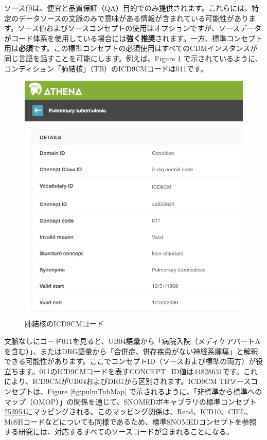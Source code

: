 \documentclass[
  11pt]{book}
\theoremstyle{definition}
\theoremstyle{definition}
\theoremstyle{definition}
\theoremstyle{definition}
\theoremstyle{remark}
\begin{document}
ソース値は、便宜と品質保証（QA）目的でのみ提供されます。これらには、特定のデータソースの文脈のみで意味がある情報が含まれている可能性があります。ソース値およびソースコンセプトの使用はオプションですが、ソースデータがコード体系を使用している場合には\textbf{強く推奨}されます。一方、標準コンセプト用は\textbf{必須}です。この標準コンセプトの必須使用はすべてのCDMインスタンスが同じ言語を話すことを可能にします。例えば、Figure \ref{fig:pulmTubICD9} で示されているように、コンディション「肺結核」（TB）のICD9CMコードは011です。

\begin{figure}

{\centering \includegraphics[width=0.75\linewidth]{images/CommonDataModel/pulmTubICD9} 

}

\caption{肺結核のICD9CMコード}\label{fig:pulmTubICD9}
\end{figure}

文脈なしにコード011を見ると、UB04語彙から「病院入院（メディケアパートAを含む）」、またはDRG語彙から「合併症、併存疾患がない神経系腫瘍」と解釈できる可能性があります。ここでコンセプトID（ソースおよび標準の両方）が役立ちます。011のICD9CMコードを表すCONCEPT\_ID値は\href{http://athena.ohdsi.org/search-terms/terms/44828631}{44828631}です。これにより、ICD9CMがUB04およびDRGから区別されます。ICD9CM TBソースコンセプトは、Figure \ref{fig:pulmTubMap} で示されるように、「非標準から標準へのマップ（OMOP）」の関係を通じて、SNOMEDボキャブラリの標準コンセプト \href{http://athena.ohdsi.org/search-terms/terms/253954}{253954}にマッピングされる。このマッピング関係は、Read、ICD10、CIEL、MeSHコードなどについても同様であるため、標準SNOMEDコンセプトを参照する研究には、対応するすべてのソースコードが含まれることになる。
\end{document}
